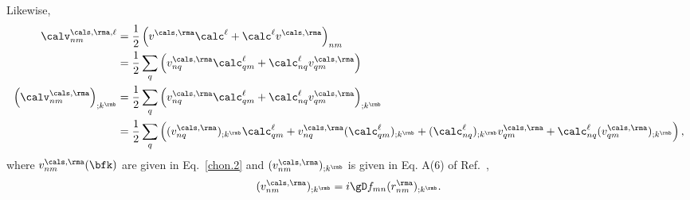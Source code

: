 Likewise,
\begin{align}\label{a.3b}
\calv^{\cals,\rma,\ell}_{nm}
&=
\frac{1}{2}\left(  
v^{\cals,\rma}\calc^\ell+\calc^\ell v^{\cals,\rma}
\right)_{nm}
\nonumber\\
&=
\frac{1}{2}\sum_q\left(  
v^{\cals,\rma}_{nq}\calc^\ell_{qm}+\calc^\ell_{nq} v^{\cals,\rma}_{qm}
\right)
\nonumber\\
\left(\calv^{\cals,\rma}_{nm}\right)_{;k^\rmb}
&=
\frac{1}{2}\sum_q\left(  
v^{\cals,\rma}_{nq}\calc^\ell_{qm}+\calc^\ell_{nq} v^{\cals,\rma}_{qm}
\right) _{;k^\rmb}
\nonumber\\
&=
\frac{1}{2}\sum_q\left(
(v^{\cals,\rma}_{nq})_{;k^\rmb}\calc^\ell_{qm}
+   
v^{\cals,\rma}_{nq}(\calc^\ell_{qm})_{;k^\rmb}
+
(\calc^\ell_{nq})_{;k^\rmb} v^{\cals,\rma}_{qm}
+
\calc^\ell_{nq} (v^{\cals,\rma}_{qm})_{;k^\rmb}
\right)
,
\end{align}   
where $v^{\cals,\rma}_{nm}(\bfk)$ are given in Eq.~\eqref{chon.2}
and
$(v^{\cals,\rma}_{nm})_{;k^\rmb}$ is given in Eq. A(6) of
Ref.~\cite{cabellosPRB09},
\begin{align}\label{choni.1}
(v^{\cals,\rma}_{nm})_{;k^\rmb}=i\gD f_{mn}
(r^\rma_{nm})_{;k^\rmb}
.
\end{align}

